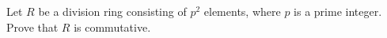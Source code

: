 \documentclass{article}
\begin{document}
Let \(R\) be a division ring consisting of \(p^2\) elements, where \(p\) is a prime integer. Prove that \(R\) is commutative.
\end{document}
